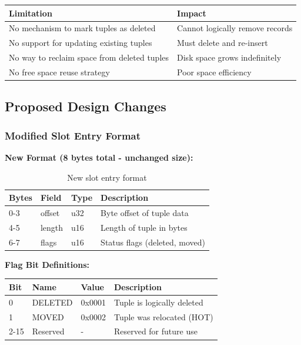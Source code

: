 \documentclass[11pt,a4paper]{article}
\begin{document}
\begin{table}[H]
\centering
\begin{tabular}{@{}p{}p{}@{}}
\toprule
\textbf{Limitation} & \textbf{Impact} \\
\midrule
No mechanism to mark tuples as deleted & Cannot logically remove records \\
No support for updating existing tuples & Must delete and re-insert \\
No way to reclaim space from deleted tuples & Disk space grows indefinitely \\
No free space reuse strategy & Poor space efficiency \\
\bottomrule
\end{tabular}
\end{table}

\subsection{Proposed Design Changes}

\subsubsection{Modified Slot Entry Format}

\textbf{New Format (8 bytes total - unchanged size):}

\begin{table}[H]
\centering
\begin{tabular}{@{}llll@{}}
\toprule
\textbf{Bytes} & \textbf{Field} & \textbf{Type} & \textbf{Description} \\
\midrule
0-3 & offset & u32 & Byte offset of tuple data \\
4-5 & length & u16 & Length of tuple in bytes \\
6-7 & flags & u16 & Status flags (deleted, moved) \\
\bottomrule
\end{tabular}
\caption{New slot entry format}
\end{table}

\textbf{Flag Bit Definitions:}

\begin{table}[H]
\centering
\begin{tabular}{@{}llll@{}}
\toprule
\textbf{Bit} & \textbf{Name} & \textbf{Value} & \textbf{Description} \\
\midrule
0 & DELETED & 0x0001 & Tuple is logically deleted \\
1 & MOVED & 0x0002 & Tuple was relocated (HOT) \\
2-15 & Reserved & - & Reserved for future use \\
\bottomrule
\end{tabular}
\end{table}
\end{document}
